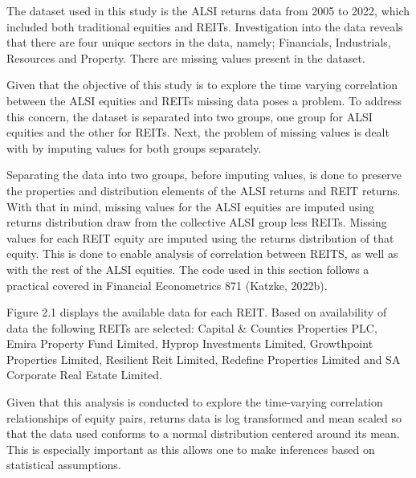 \documentclass[11pt,preprint, authoryear]{elsarticle}
\numberwithin{equation}{section}
\numberwithin{figure}{section}
\numberwithin{table}{section}
\begin{document}
The dataset used in this study is the ALSI returns data from 2005 to
2022, which included both traditional equities and REITs. Investigation
into the data reveals that there are four unique sectors in the data,
namely; Financials, Industrials, Resources and Property. There are
missing values present in the dataset.

Given that the objective of this study is to explore the time varying
correlation between the ALSI equities and REITs missing data poses a
problem. To address this concern, the dataset is separated into two
groups, one group for ALSI equities and the other for REITs. Next, the
problem of missing values is dealt with by imputing values for both
groups separately.

Separating the data into two groups, before imputing values, is done to
preserve the properties and distribution elements of the ALSI returns
and REIT returns. With that in mind, missing values for the ALSI
equities are imputed using returns distribution draw from the collective
ALSI group less REITs. Missing values for each REIT equity are imputed
using the returns distribution of that equity. This is done to enable
analysis of correlation between REITS, as well as with the rest of the
ALSI equities. The code used in this section follows a practical covered
in Financial Econometrics 871 (Katzke, 2022b).

Figure 2.1 displays the available data for each REIT. Based on
availability of data the following REITs are selected: Capital \&
Counties Properties PLC, Emira Property Fund Limited, Hyprop Investments
Limited, Growthpoint Properties Limited, Resilient Reit Limited,
Redefine Properties Limited and SA Corporate Real Estate Limited.

Given that this analysis is conducted to explore the time-varying
correlation relationships of equity pairs, returns data is log
transformed and mean scaled so that the data used conforms to a normal
distribution centered around its mean. This is especially important as
this allows one to make inferences based on statistical assumptions.
\end{document}
